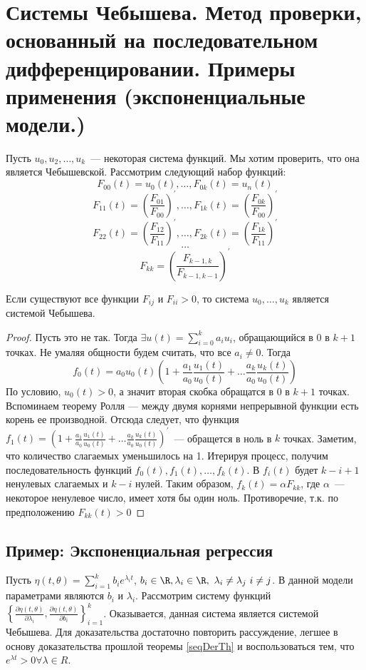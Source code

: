 
\section{Системы Чебышева. Метод проверки, основанный на последовательном дифференцировании. Примеры применения (экспоненциальные модели.)}

Пусть $u_0, u_2,…, u_k$ — некоторая система функций. Мы хотим проверить, что она является Чебышевской. 
Рассмотрим следующий набор функций:
$$ F_{00}(t) = u_0(t), …, F_{0k}(t) = u_n(t)$$
$$F_{11}(t) = \left(\frac{F_{01}}{F_{00}}\right)^{'}, …, F_{1k}(t) = \left(\frac{F_{0k}}{F_{00}}\right)^{'}$$
$$F_{22}(t) = \left(\frac{F_{12}}{F_{11}}\right)^{'}, …, F_{2k}(t) = \left(\frac{F_{1k}}{F_{11}}\right)^{'} $$
$$ … $$
$$F_{kk} = \left(\frac{F_{k-1, k}}{F_{k-1, k-1}}\right)^{'}$$
\begin{thm}
\label{seqDerTh}
Если существуют все функции $F_{ij}$ и $F_{ii} > 0$, то система $u_0, …, u_k$ является системой Чебышева.
\end{thm}
\begin{proof}
Пусть это не так. Тогда $\exists u(t) = \sum \limits_{i=0}^{k} a_i u_i$, обращающийся в 0 в $k+1$ точках. Не умаляя общности будем считать, что все $a_i \neq 0$. Тогда 
$$ f_0(t) = a_0u_0(t)\left(1 + \frac{a_1}{a_0} \frac{u_1(t)}{u_0(t)} + … \frac{a_k}{a_0}\frac{u_k(t)}{u_0(t)}\right)$$
По условию, $u_0(t) > 0$, а значит вторая скобка обращатся в 0 в $k+1$ точках. Вспоминаем теорему Ролля — между двумя корнями непрерывной функции есть корень ее производной. Отсюда следует, что функция 
$f_1(t) = \left(1 + \frac{a_1}{a_0} \frac{u_1(t)}{u_0(t)} + … \frac{a_k}{a_0}\frac{u_k(t)}{u_0(t)}\right)^{'}$ — обращется в ноль в $k$ точках. Заметим, что количество слагаемых уменьшилось на 1. Итерируя процесс, получим 
последовательность функций $f_0(t), f_1(t), …, f_k(t)$. В $f_i(t)$ будет $k-i+1$ ненулевых слагаемых и $k-i$ нулей. Таким образом, $f_k(t) = \alpha F_{kk}$, где $\alpha$ — некоторое ненулевое число, имеет хотя бы один ноль. Противоречие, т.к. по предположению $F_{kk}(t) > 0$
\end{proof}
\subsection{Пример: Экспоненциальная регрессия}
Пусть $\eta(t, \theta) = \sum\limits_{i=1}^k b_i e^{\lambda_it}$, $b_i \in \R, \lambda_i \in \R, \lambda_i \neq \lambda_j i \neq j$. В данной модели параметрами являются $b_i$ и $\lambda_i$. Рассмотрим систему функций 
$\left\{ \frac{\partial \eta(t, \theta)}{\partial \lambda_i}, \frac{\partial \eta(t, \theta)}{\partial b_i} \right\}_{i=1}^{k}$. Оказывается, данная система является системой Чебышева. Для доказательства достаточно повторить рассуждение, легшее в основу доказательства прошлой теоремы \eqref{seqDerTh} и воспользоваться тем, что $e^{\lambda t} > 0 \forall \lambda \in R$.

